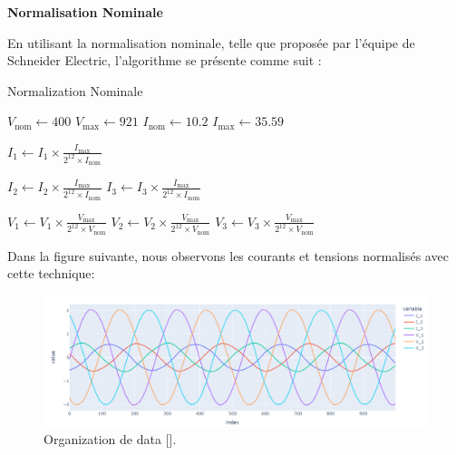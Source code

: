 \textbf{Normalisation Nominale}

En utilisant la normalisation nominale, telle que proposée par l'équipe de
Schneider Electric, l'algorithme se présente comme suit :

\begin{algorithm}[H]
  \caption{Normalization Nominale}

  \Initialization{}

  \( V_{\text{nom}} \gets 400 \) \;
  \( V_{\text{max}} \gets 921 \) \;
  \( I_{\text{nom}} \gets 10.2 \) \;
  \( I_{\text{max}} \gets 35.59 \) \;

  \Normalization{}

  \( I_1 \gets I_1 \times \frac{I_{\text{max}}}{2^{12} \times I_{\text{nom}}} \) \;

  \( I_2 \gets I_2 \times \frac{I_{\text{max}}}{2^{12} \times I_{\text{nom}}} \) \;
  \( I_3 \gets I_3 \times \frac{I_{\text{max}}}{2^{12} \times I_{\text{nom}}} \) \;

  \( V_1 \gets V_1 \times \frac{V_{\text{max}}}{2^{12} \times V_{\text{nom}}} \) \;
  \( V_2 \gets V_2 \times \frac{V_{\text{max}}}{2^{12} \times V_{\text{nom}}} \) \;
  \( V_3 \gets V_3 \times \frac{V_{\text{max}}}{2^{12} \times V_{\text{nom}}} \) \;


\end{algorithm}
\FloatBarrier

Dans la figure suivante, nous observons les courants et tensions normalisés
avec cette technique:

\begin{figure}[hbt!]
  \centering
  \includegraphics[width=14cm]{images_pfe/normalization_nominale.png}
  \caption{Organization de data [\cite{yoon2019time}].}
  \label{fig:data_norm}
\end{figure}
\FloatBarrier

